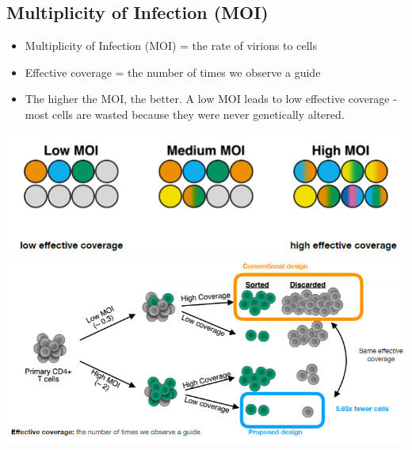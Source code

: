 \documentclass[10pt]{article}
\begin{document}
\subsection*{Multiplicity of Infection (MOI)}
\begin{itemize}
    \item Multiplicity of Infection (MOI) = the rate of virions to cells
    \item Effective coverage = the number of times we observe a guide
    \item The higher the MOI, the better.  A low MOI leads to low effective coverage - most cells are wasted because they were never genetically altered.
\end{itemize}
\begin{center}
    \includegraphics*[scale=0.8]{W9_7.png}
    \includegraphics*[scale=0.8]{W9_8.png}
\end{center}
\end{document}
